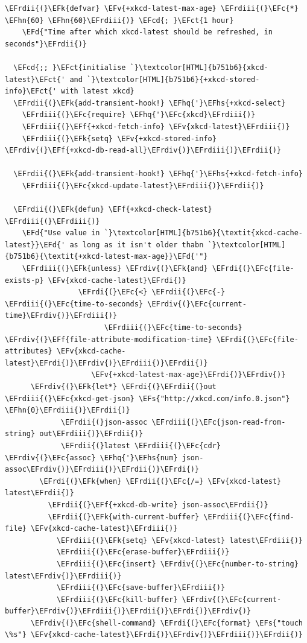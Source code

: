 \documentclass{scrartcl}
\newcommand{\EFk}[1]{\textcolor{EFk}{#1}} %
\newcommand{\EFd}[1]{\textcolor{EFd}{\textit{#1}}} %
\newcommand{\EFs}[1]{\textcolor{EFs}{#1}} %
\newcommand{\EFct}[1]{\textcolor{EFct}{#1}} %
\newcommand{\EFc}[1]{\textcolor{EFc}{#1}} %
\newcommand{\EFv}[1]{\textcolor{EFv}{#1}} %
\newcommand{\EFf}[1]{\textcolor{EFf}{#1}} %
\newcommand{\EFcd}[1]{\textcolor{EFcd}{#1}} %
\newcommand{\EFhn}[1]{\textcolor{EFhn}{\textbf{#1}}} %
\newcommand{\EFhq}[1]{\textcolor{EFhq}{#1}} %
\newcommand{\EFhs}[1]{\textcolor{EFhs}{#1}} %
\newcommand{\EFrdi}[1]{\textcolor{EFrdi}{#1}} %
\newcommand{\EFrdii}[1]{\textcolor{EFrdii}{#1}} %
\newcommand{\EFrdiii}[1]{\textcolor{EFrdiii}{#1}} %
\newcommand{\EFrdiv}[1]{\textcolor{EFrdiv}{#1}} %
\begin{document}
\begin{Code}
\begin{Verbatim}[]
  \EFrdii{(}\EFk{defvar} \EFv{+xkcd-latest-max-age} \EFrdiii{(}\EFc{*} \EFhn{60} \EFhn{60}\EFrdiii{)} \EFcd{; }\EFct{1 hour}
    \EFd{"Time after which xkcd-latest should be refreshed, in seconds"}\EFrdii{)}

  \EFcd{;; }\EFct{initialise `}\textcolor[HTML]{b751b6}{xkcd-latest}\EFct{' and `}\textcolor[HTML]{b751b6}{+xkcd-stored-info}\EFct{' with latest xkcd}
  \EFrdii{(}\EFk{add-transient-hook!} \EFhq{'}\EFhs{+xkcd-select}
    \EFrdiii{(}\EFc{require} \EFhq{'}\EFc{xkcd}\EFrdiii{)}
    \EFrdiii{(}\EFf{+xkcd-fetch-info} \EFv{xkcd-latest}\EFrdiii{)}
    \EFrdiii{(}\EFk{setq} \EFv{+xkcd-stored-info} \EFrdiv{(}\EFf{+xkcd-db-read-all}\EFrdiv{)}\EFrdiii{)}\EFrdii{)}

  \EFrdii{(}\EFk{add-transient-hook!} \EFhq{'}\EFhs{+xkcd-fetch-info}
    \EFrdiii{(}\EFc{xkcd-update-latest}\EFrdiii{)}\EFrdii{)}

  \EFrdii{(}\EFk{defun} \EFf{+xkcd-check-latest} \EFrdiii{(}\EFrdiii{)}
    \EFd{"Use value in `}\textcolor[HTML]{b751b6}{\textit{xkcd-cache-latest}}\EFd{' as long as it isn't older thabn `}\textcolor[HTML]{b751b6}{\textit{+xkcd-latest-max-age}}\EFd{'"}
    \EFrdiii{(}\EFk{unless} \EFrdiv{(}\EFk{and} \EFrdi{(}\EFc{file-exists-p} \EFv{xkcd-cache-latest}\EFrdi{)}
                 \EFrdi{(}\EFc{<} \EFrdii{(}\EFc{-} \EFrdiii{(}\EFc{time-to-seconds} \EFrdiv{(}\EFc{current-time}\EFrdiv{)}\EFrdiii{)}
                       \EFrdiii{(}\EFc{time-to-seconds} \EFrdiv{(}\EFf{file-attribute-modification-time} \EFrdi{(}\EFc{file-attributes} \EFv{xkcd-cache-latest}\EFrdi{)}\EFrdiv{)}\EFrdiii{)}\EFrdii{)}
                    \EFv{+xkcd-latest-max-age}\EFrdi{)}\EFrdiv{)}
      \EFrdiv{(}\EFk{let*} \EFrdi{(}\EFrdii{(}out \EFrdiii{(}\EFc{xkcd-get-json} \EFs{"http://xkcd.com/info.0.json"} \EFhn{0}\EFrdiii{)}\EFrdii{)}
             \EFrdii{(}json-assoc \EFrdiii{(}\EFc{json-read-from-string} out\EFrdiii{)}\EFrdii{)}
             \EFrdii{(}latest \EFrdiii{(}\EFc{cdr} \EFrdiv{(}\EFc{assoc} \EFhq{'}\EFhs{num} json-assoc\EFrdiv{)}\EFrdiii{)}\EFrdii{)}\EFrdi{)}
        \EFrdi{(}\EFk{when} \EFrdii{(}\EFc{/=} \EFv{xkcd-latest} latest\EFrdii{)}
          \EFrdii{(}\EFf{+xkcd-db-write} json-assoc\EFrdii{)}
          \EFrdii{(}\EFk{with-current-buffer} \EFrdiii{(}\EFc{find-file} \EFv{xkcd-cache-latest}\EFrdiii{)}
            \EFrdiii{(}\EFk{setq} \EFv{xkcd-latest} latest\EFrdiii{)}
            \EFrdiii{(}\EFc{erase-buffer}\EFrdiii{)}
            \EFrdiii{(}\EFc{insert} \EFrdiv{(}\EFc{number-to-string} latest\EFrdiv{)}\EFrdiii{)}
            \EFrdiii{(}\EFc{save-buffer}\EFrdiii{)}
            \EFrdiii{(}\EFc{kill-buffer} \EFrdiv{(}\EFc{current-buffer}\EFrdiv{)}\EFrdiii{)}\EFrdii{)}\EFrdi{)}\EFrdiv{)}
      \EFrdiv{(}\EFc{shell-command} \EFrdi{(}\EFc{format} \EFs{"touch \%s"} \EFv{xkcd-cache-latest}\EFrdi{)}\EFrdiv{)}\EFrdiii{)}\EFrdii{)}


\end{Verbatim}
\end{Code}
\end{document}
